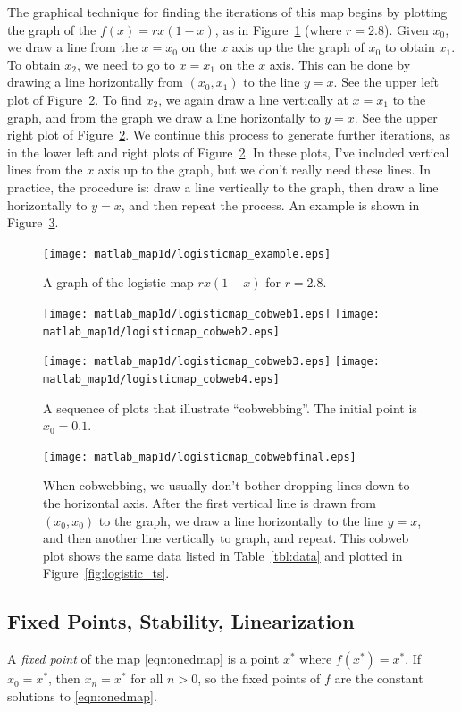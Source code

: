 \documentclass[reqno]{immbook}
\numberwithin{equation}{chapter}
\numberwithin{question}{section}
\numberwithin{theorem}{chapter}
\numberwithin{figure}{chapter}
\theoremstyle{definition}
\begin{document}
The graphical technique for finding the iterations of this map
begins by plotting the graph of the $f(x) = rx(1-x)$, as in
Figure~\ref{fig:logisticmap_example} (where $r=2.8$).
Given $x_0$, we draw a line from the $x=x_0$ on the $x$
axis up the the graph of $x_0$ to obtain $x_1$.
To obtain $x_2$, we need to go to $x=x_1$ on the $x$ axis.
This can be done by drawing a line horizontally from
$(x_0,x_1)$ to the line $y=x$.
See the upper left plot of Figure~\ref{fig:cobwebsequence}.
To find $x_2$, we again draw a line vertically
at $x=x_1$ to the graph, and from the graph we draw a 
line horizontally to $y=x$.
See the upper right plot of Figure~\ref{fig:cobwebsequence}.
We continue this process to generate further iterations,
as in the lower left and right plots of
Figure~\ref{fig:cobwebsequence}.
In these plots, I've included vertical lines from the $x$ axis
up to the graph, but we don't really need these lines.
In practice, the procedure is: 
draw a line vertically
to the graph, then 
draw a line horizontally to $y=x$,  and then repeat
the process.
An example is shown in Figure~\ref{fig:cobwebfinal}.

\begin{figure}
\centerline{\texttt{[image: matlab\_map1d/logisticmap\_example.eps]}}
\caption{A graph of the logistic map $rx(1-x)$ for $r=2.8$.}
\label{fig:logisticmap_example}
\end{figure}
%
\begin{figure}
\centerline{%
\texttt{[image: matlab\_map1d/logisticmap\_cobweb1.eps]}
\texttt{[image: matlab\_map1d/logisticmap\_cobweb2.eps]}
}
\centerline{%
\texttt{[image: matlab\_map1d/logisticmap\_cobweb3.eps]}
\texttt{[image: matlab\_map1d/logisticmap\_cobweb4.eps]}
}
\caption{A sequence of plots that illustrate
``cobwebbing''. The initial point is $x_0=0.1$.}
\label{fig:cobwebsequence}
\end{figure}
%
\begin{figure}
\centerline{%
\texttt{[image: matlab\_map1d/logisticmap\_cobwebfinal.eps]}
}
\caption{When cobwebbing, we usually don't bother dropping
lines down to the horizontal axis. After the first vertical
line is drawn from $(x_0,x_0)$ to the graph, we draw
a line horizontally to the line
$y=x$, and then another line vertically to graph, and repeat.
This cobweb plot shows
the same data listed in Table~\ref{tbl:data} and plotted in
Figure~\ref{fig:logistic_ts}.}
\label{fig:cobwebfinal} 
\end{figure}
%


%
\subsection*{Fixed Points, Stability, Linearization}
A \emph{fixed point} of the map \eqref{eqn:onedmap}
is a point $x^*$ where $f(x^*)=x^*$.
If $x_0=x^*$, then $x_n=x^*$ for all $n>0$, so the fixed points
of $f$ are the constant solutions to \eqref{eqn:onedmap}.
\end{document}
